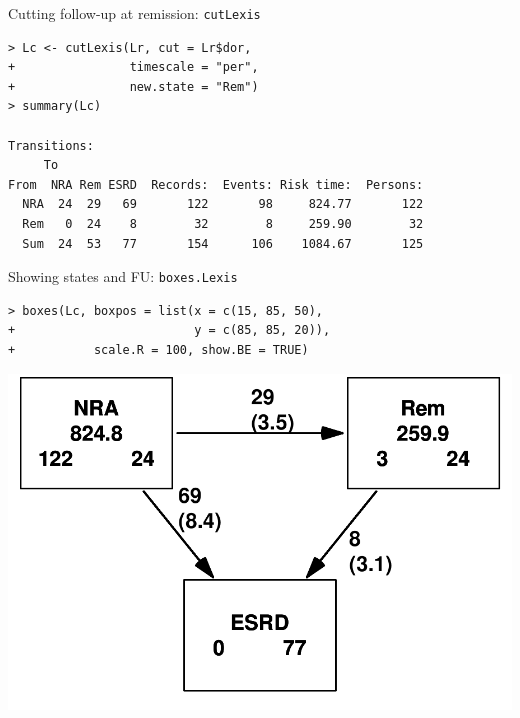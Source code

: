 \begin{frame}[fragile]{Cutting follow-up at remission: \texttt{cutLexis}}
\renewcommand{\baselinestretch}{0.8}
\footnotesize
\begin{verbatim}
> Lc <- cutLexis(Lr, cut = Lr$dor,
+                timescale = "per",
+                new.state = "Rem")
> summary(Lc)

Transitions:
     To
From  NRA Rem ESRD  Records:  Events: Risk time:  Persons:
  NRA  24  29   69       122       98     824.77       122
  Rem   0  24    8        32        8     259.90        32
  Sum  24  53   77       154      106    1084.67       125
\end{verbatim}
\normalsize
\renewcommand{\baselinestretch}{1.0}
\end{frame}

\begin{frame}[fragile]{Showing states and FU: \texttt{boxes.Lexis}}
\renewcommand{\baselinestretch}{0.8}
\footnotesize
\begin{verbatim}
> boxes(Lc, boxpos = list(x = c(15, 85, 50),
+                         y = c(85, 85, 20)),
+           scale.R = 100, show.BE = TRUE)
\end{verbatim}
\normalsize
\renewcommand{\baselinestretch}{1.0}
\includegraphics[height=0.6\textheight,keepaspectratio]{./NRA-death-3}
\end{frame}

